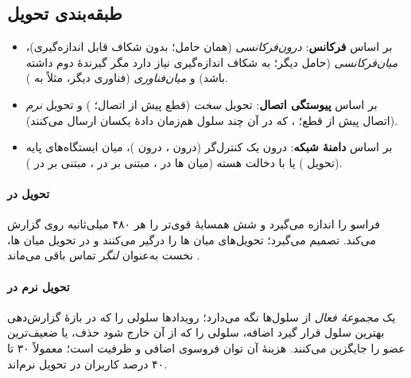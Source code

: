 \documentclass[11pt,a4paper]{article}
\begin{document}
\subsection{طبقه‌بندی تحویل}
\begin{itemize}
  \item بر اساس \textbf{فرکانس}: \emph{درون‌فرکانسی} (همان حامل؛ بدون شکاف قابل اندازه‌گیری)،
        \emph{میان‌فرکانسی} (حامل دیگر؛  به شکاف اندازه‌گیری نیاز دارد مگر گیرندهٔ دوم داشته
        باشد) و \emph{میان‌فناوری} (فناوری دیگر، مثلاً  به ).
  \item بر اساس \textbf{پیوستگی اتصال}: تحویل \emph{سخت} (قطع پیش از اتصال؛ ) و
        تحویل \emph{نرم} (اتصال پیش از قطع؛ ، که در آن چند سلول هم‌زمان دادهٔ یکسان ارسال می‌کنند).
  \item بر اساس \textbf{دامنهٔ شبکه}: درون یک کنترل‌گر (درون ، درون )، میان
        ایستگاه‌های پایه (تحویل ) یا با دخالت هسته (میان ها در ، مبتنی بر
         در ، مبتنی بر  در ).
\end{itemize}

\paragraph{تحویل در }  فراسو را اندازه می‌گیرد و  شش همسایهٔ قوی‌تر را
هر ۴۸۰ میلی‌ثانیه روی  گزارش می‌کند.  تصمیم می‌گیرد؛ تحویل‌های میان ها
 را درگیر می‌کنند و در تحویل میان ها،  نخست به‌عنوان \emph{لنگر} تماس
باقی می‌ماند \cite{ts23009}.

\paragraph{تحویل نرم در }  یک \emph{مجموعهٔ فعال} از سلول‌ها نگه می‌دارد؛ رویدادها
سلولی را که در بازهٔ گزارش‌دهی بهترین سلول قرار گیرد اضافه، سلولی را که از آن خارج شود حذف، یا
ضعیف‌ترین عضو را جایگزین می‌کنند. هزینهٔ آن توان فروسوی اضافی و ظرفیت  است؛ معمولاً ۳۰ تا
۴۰ درصد کاربران در تحویل نرم‌اند.
\end{document}
